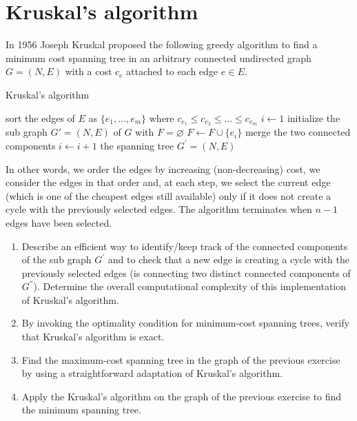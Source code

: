 \documentclass[12pt, a4paper]{report}
\begin{document}
    \newpage

    \section{Kruskal's algorithm}
        In 1956 Joseph Kruskal proposed the following greedy algorithm to find a minimum cost spanning tree in an arbitrary connected undirected graph $G = (N, E)$ with a cost
        $c_e$ attached to each edge $e \in E$. 
        \begin{algorithm}[H]
            \caption{Kruskal's algorithm}
                \begin{algorithmic}[1]
                    \State sort the edges of $E$ as $\{e_1,\dots,e_m\}$ where $c_{e_1} \leq c_{e_2} \leq \dots \leq c_{e_m}$
                    \State $i \leftarrow 1$
                    \State initialize the sub graph $G' = (N, E)$ of $G$ with $F=\varnothing$
                            \State $F \leftarrow F \cup \{e_i\}$
                            \State merge the two connected components 
                        \EndIf 
                        \State $i \leftarrow i+1$
                    \EndWhile
                    \State \Return the spanning tree $G^{'} = (N, E)$ 
                \end{algorithmic}
        \end{algorithm}
        In other words, we order the edges by increasing (non-decreasing) cost, we consider the edges in that order and, at each step, we select the current edge (which is 
        one of the cheapest edges still available) only if it does not create a cycle with the previously selected edges. The algorithm terminates when $n-1$ edges have
        been selected. 
        \begin{enumerate}
            \item Describe an efficient way to identify/keep track of the connected components of the sub graph $G^{'}$ and to check that a new edge is creating a cycle with 
                the previously selected edges (is connecting two distinct connected components of $G^{''}$). Determine the overall computational complexity of this 
                implementation of Kruskal's algorithm. 
            \item By invoking the optimality condition for minimum-cost spanning trees, verify that Kruskal's algorithm is exact. 
            \item Find the maximum-cost spanning tree in the graph of the previous exercise by using a straightforward adaptation of Kruskal's algorithm. 
            \item Apply the Kruskal's algorithm on the graph of the previous exercise to find the minimum spanning tree. 
        \end{enumerate}
\end{document}

